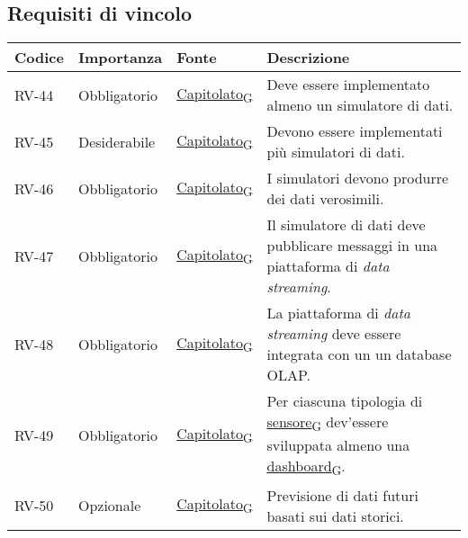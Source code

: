 \subsection{Requisiti di vincolo}
\begin{longtable}{|>{\centering\arraybackslash}m{}|>{\centering\arraybackslash}m{}|>{\centering\arraybackslash}m{}|>{\centering\arraybackslash}m{}|}
	\hline
	\textbf{Codice} & \textbf{Importanza} & \textbf{Fonte} & \textbf{Descrizione}
	\\\hline
	\endfirsthead
	\hline
	\endhead
	RV-44           & Obbligatorio        & \href{https://7last.github.io/docs/rtb/documentazione-interna/glossario\#capitolato}{Capitolato\textsubscript{G}}     & Deve essere implementato almeno un simulatore di dati.
	\\\hline
	RV-45           & Desiderabile        & \href{https://7last.github.io/docs/rtb/documentazione-interna/glossario\#capitolato}{Capitolato\textsubscript{G}}     & Devono essere implementati più simulatori di dati.
	\\\hline
	RV-46           & Obbligatorio        & \href{https://7last.github.io/docs/rtb/documentazione-interna/glossario\#capitolato}{Capitolato\textsubscript{G}}     & I simulatori devono produrre dei dati verosimili.                                                       \\\hline
	RV-47           & Obbligatorio        & \href{https://7last.github.io/docs/rtb/documentazione-interna/glossario\#capitolato}{Capitolato\textsubscript{G}}     & Il simulatore di dati deve pubblicare messaggi in una piattaforma di \textit{data streaming}.
	\\\hline
	RV-48           & Obbligatorio        & \href{https://7last.github.io/docs/rtb/documentazione-interna/glossario\#capitolato}{Capitolato\textsubscript{G}}     & La piattaforma di \textit{data streaming} deve essere integrata con un un database OLAP.
	\\\hline
	RV-49           & Obbligatorio        & \href{https://7last.github.io/docs/rtb/documentazione-interna/glossario\#capitolato}{Capitolato\textsubscript{G}}     & Per ciascuna tipologia di \href{https://7last.github.io/docs/rtb/documentazione-interna/glossario\#sensore}{sensore\textsubscript{G}} dev'essere sviluppata almeno una \href{https://7last.github.io/docs/rtb/documentazione-interna/glossario\#dashboard}{dashboard\textsubscript{G}}.
	\\\hline
	RV-50           & Opzionale           & \href{https://7last.github.io/docs/rtb/documentazione-interna/glossario\#capitolato}{Capitolato\textsubscript{G}}     & Previsione di dati futuri basati sui dati storici.                                                      \\\hline

\end{longtable}
